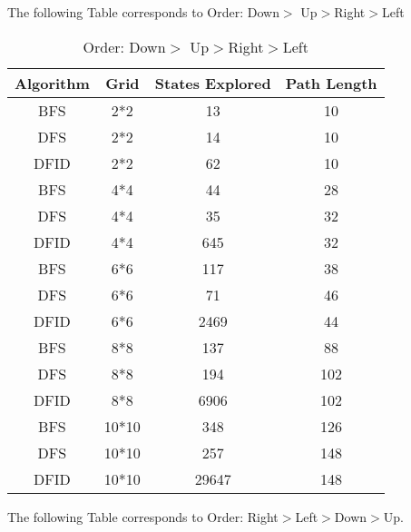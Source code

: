 \documentclass{article}
\begin{document}
The following Table corresponds to Order: Down$>$ Up$>$Right$>$Left

\begin{table}[H]
\begin{tabular}{|c|c|c|c|}
    \hline
    Algorithm & Grid & States Explored & Path Length \\
    \hline
    BFS & 2*2 & 13  & 10 \\
    \hline
    DFS & 2*2 & 14 & 10 \\
    \hline
    DFID & 2*2 & 62 & 10 \\
    \hline
    BFS & 4*4 & 44 & 28 \\
    \hline
    DFS & 4*4 & 35 & 32 \\
    \hline
    DFID & 4*4 & 645 & 32 \\
    \hline
    BFS & 6*6 & 117 & 38 \\
    \hline
    DFS & 6*6 & 71 & 46 \\
    \hline
    DFID & 6*6 & 2469 & 44 \\
    \hline
    BFS & 8*8 & 137 & 88 \\
    \hline
    DFS & 8*8 & 194 & 102 \\
    \hline
    DFID & 8*8 & 6906 & 102 \\
    \hline
    BFS & 10*10 & 348 & 126 \\
    \hline
    DFS & 10*10 & 257 & 148 \\
    \hline
    DFID & 10*10 & 29647 & 148 \\
    \hline

\end{tabular}
\caption{Order: Down$>$ Up$>$Right$>$Left}
\end{table}

The following Table corresponds to Order: Right$>$Left$>$Down$>$Up.
\end{document}
